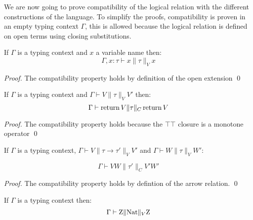 We are now going to prove compatibility of the logical relation with 
the different constructions of the language. To simplify the proofs, 
compatibility is proven in an empty typing context $\Gamma$, this is allowed 
because the logical relation is defined on open terms using closing 
substitutions.

\begin{lemma}
    If $\Gamma$ is a typing context and $x$ a variable name then:
    \begin{equation*}
        \Gamma, x:\tau \vdash x \| \tau \|_V x 
    \end{equation*}
\end{lemma}

\begin{proof}
    The compatibility property holds by definition of the open extension
\qed\end{proof}

\begin{lemma}
    If $\Gamma$ is a typing context and $\Gamma \vdash V \| \tau \|_V V'$ then:
    \begin{equation*}
        \Gamma \vdash \operatorname{return} V \| \tau \|_C \operatorname{return} V
    \end{equation*}
\end{lemma}

\begin{proof}
    The compatibility property holds because the $\top\top$ closure 
    is a monotone operator
\qed\end{proof}

\begin{lemma}
    If $\Gamma$ is a typing context,
    $\Gamma \vdash V \| \tau \to \tau' \|_V V'$ 
    and $\Gamma \vdash W \| \tau \|_V W'$:

    \begin{equation*}
        \Gamma \vdash VW \| \tau' \|_C V'W'
    \end{equation*}
\end{lemma}

\begin{proof}
    The compatibility property holds by defintion of the arrow relation.
\qed\end{proof}

\begin{lemma}
    If $\Gamma$ is a typing context then:
    \begin{equation*}
        \Gamma \vdash \textnormal{Z} \| \textnormal{Nat} \|_V \textnormal{Z} 
    \end{equation*}
\end{lemma}

